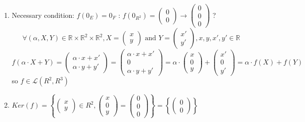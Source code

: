 \documentclass[notitlepage]{math}
\begin{document}
\begin{enumerate}[label=\protect\circled{\arabic*}]
    \item Necessary condition: $f(0_{E}) = 0_{F}$ : 
    $f(0_{R^2}) = \begin{pmatrix} 0 \\ 0 \end{pmatrix} 
    \rightarrow \begin{pmatrix} 0 \\ 0 \\ 0 \end{pmatrix}$ ?
    \[\forall (\alpha, X, Y) \in \mathbb{R} \times  \mathbb{R}^2 \times \mathbb{R}^2, X = \begin{pmatrix} x \\ y \end{pmatrix} \text{ and } Y = \begin{pmatrix} x' \\ y' \end{pmatrix}, x,y,x',y' \in \mathbb{R}\]
    \[f(\alpha \cdot X + Y) = \begin{pmatrix} \alpha \cdot x + x' \\ \alpha \cdot y + y' \end{pmatrix} = \begin{pmatrix} \alpha \cdot x + x' \\ 0 \\ \alpha \cdot y + y' \end{pmatrix} = \alpha \cdot \begin{pmatrix} x \\ 0 \\ y \end{pmatrix} + \begin{pmatrix} x' \\ 0 \\ y' \end{pmatrix} = \alpha \cdot f(X) + f(Y)\]
    so  $f \in \mathcal{L}(R^2,R^3)$ \checkmark
    \item $Ker(f) = \left\{ \begin{pmatrix} x \\ y \end{pmatrix} \in R^2, \begin{pmatrix} x \\ 0 \\ y \end{pmatrix} = \begin{pmatrix} 0 \\ 0 \\ 0 \end{pmatrix} \right\} = \left\{ \begin{pmatrix} 0 \\ 0 \end{pmatrix} \right\}$

\end{enumerate}
\end{document}
